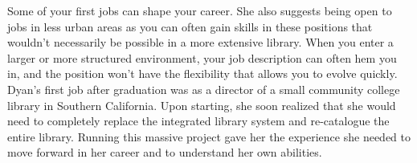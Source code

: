 \documentclass[
  letterpaper,
  DIV=11,
  numbers=noendperiod]{scrreprt}
\begin{document}
\begin{tcolorbox}
Some of your first jobs can shape your career. She also suggests being
open to jobs in less urban areas as you can often gain skills in these
positions that wouldn't necessarily be possible in a more extensive
library. When you enter a larger or more structured environment, your
job description can often hem you in, and the position won't have the
flexibility that allows you to evolve quickly. Dyan's first job after
graduation was as a director of a small community college library in
Southern California. Upon starting, she soon realized that she would
need to completely replace the integrated library system and
re-catalogue the entire library. Running this massive project gave her
the experience she needed to move forward in her career and to
understand her own abilities.

\end{tcolorbox}
\end{document}
